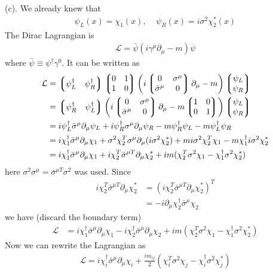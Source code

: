 \documentclass{article}
\newcommand{\lag}{\mathcal{L}}
\begin{document}
(c). We already knew that
\begin{align*}
  \psi_L(x)=\chi_1(x),\;\;\;\;\psi_R(x)=i\sigma^2\chi^*_2(x)
\end{align*}
The Dirac Lagrangian is
\begin{align}
  \lag=\bar{\psi}(i\gamma^{\mu}\partial_{\mu}-m)\psi
\end{align}
where $\bar{\psi}\equiv\psi^{\dagger}\gamma^0$. It can be written as
\begin{align*}
  \lag&=\Pmqty{\psi_L^{\dagger}&\psi_R^{\dagger}}\Pmqty{0&1\\1&0}\pqty{i\Pmqty{0&\sigma^{\mu}\\\bar{\sigma}^{\mu}&0}\partial_{\mu}-m}\Pmqty{\psi_L\\\psi_R}\\
  &=\Pmqty{\psi_R^{\dagger}&\psi_L^{\dagger}}\pqty{i\Pmqty{0&\sigma^{\mu}\\\bar{\sigma}^{\mu}&0}\partial_{\mu}-m\Pmqty{1&0\\0&1}}\Pmqty{\psi_L\\\psi_R}\\
  &=i\psi_L^{\dagger}\bar{\sigma}^{\mu}\partial_{\mu}\psi_L+i\psi_R^{\dagger}\sigma^{\mu}\partial_{\mu}\psi_R-m\psi_R^{\dagger}\psi_L-m\psi_L^{\dagger}\psi_R\\
  &=i\chi_1^{\dagger}\bar{\sigma}^{\mu}\partial_{\mu}\chi_1+\sigma^2\chi_2^T\sigma^{\mu}\partial_{\mu}(i\sigma^2\chi^*_2)+mi\sigma^2\chi^T_2\chi_1-m\chi_1^{\dagger}i\sigma^2\chi^*_2\\
  &=i\chi_1^{\dagger}\bar{\sigma}^{\mu}\partial_{\mu}\chi_1+i\chi_2^T\bar{\sigma}^{\mu T}\partial_{\mu}\chi^*_2+im(\chi^T_2\sigma^2\chi_1-\chi_1^{\dagger}\sigma^2\chi^*_2)
\end{align*}
here $\sigma^2\sigma^{\mu}=\bar{\sigma}^{\mu T}\sigma^2$ was used. Since
\begin{align*}
  i\chi_2^T\bar{\sigma}^{\mu T}\partial_{\mu}\chi^*_2&=(i\chi_2^T\bar{\sigma}^{\mu T}\partial_{\mu}\chi_2^*)^T\\
  &=-i\partial_{\mu}\chi_2^{\dagger}\bar{\sigma}^{\mu}\chi_2
\end{align*}
we have (discard the boundary term)
\begin{align*}
  \lag&=i\chi_1^{\dagger}\bar{\sigma}^{\mu}\partial_{\mu}\chi_1-i\chi_2^{\dagger}\bar{\sigma}^{\mu}\partial_{\mu}\chi_2+im(\chi^T_2\sigma^2\chi_1-\chi_1^{\dagger}\sigma^2\chi^*_2)
\end{align*}
Now we can rewrite the Lagrangian as
\begin{align*}
  \lag=i\chi^{\dagger}_i\bar{\sigma}^{\mu}\partial_{\mu}\chi_i+\frac{im_{ij}}{2}(\chi^T_i\sigma^2\chi_j-\chi_i^{\dagger}\sigma^2\chi^*_j)
\end{align*}
\end{document}
